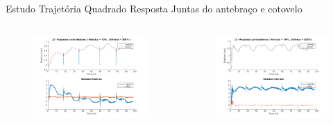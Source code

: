 \documentclass{beamer}
\begin{document}
\begin{frame}{Estudo Trajetória Quadrado}
Resposta Juntas do antebraço e cotovelo
\begin{columns}
\begin{column}{0.5\textwidth}
   \begin{figure}
    \centering
    \includegraphics[width = \linewidth]{tex/figs/squareStiffJ3stateEval_J2v70s500.png}
    \label{fig:mekademo}
\end{figure}
\end{column}
\begin{column}{0.5\textwidth}  %
    \begin{figure}
    \centering
    \includegraphics[width = \linewidth]{tex/figs/squareStiffJ3stateEval_J3v70s500.png}
    \label{fig:mekademo}
\end{figure}
\end{column}
\end{columns}
\end{frame}
\end{document}
